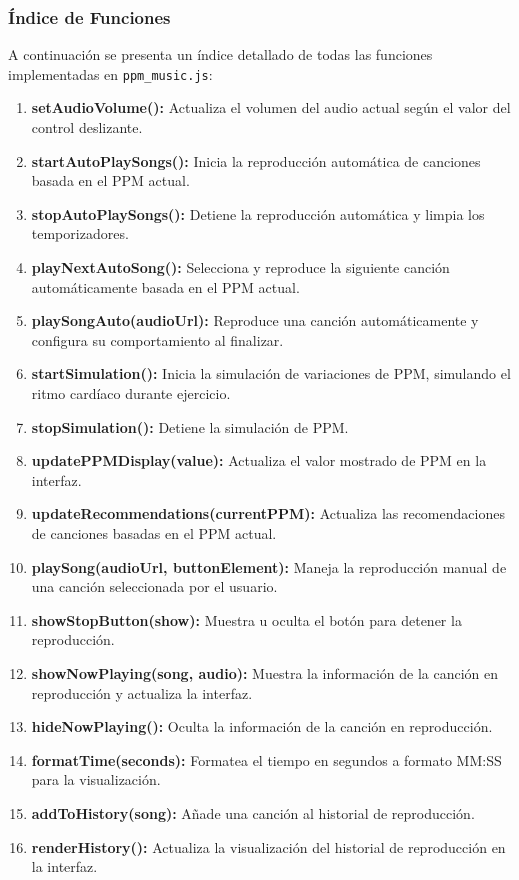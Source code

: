 \documentclass[a4paper,12pt]{article}
\begin{document}
\subsubsection{Índice de Funciones}
A continuación se presenta un índice detallado de todas las funciones implementadas en \texttt{ppm\_music.js}:

\begin{enumerate}
    \item \textbf{setAudioVolume():} Actualiza el volumen del audio actual según el valor del control deslizante.
    \item \textbf{startAutoPlaySongs():} Inicia la reproducción automática de canciones basada en el PPM actual.
    \item \textbf{stopAutoPlaySongs():} Detiene la reproducción automática y limpia los temporizadores.
    \item \textbf{playNextAutoSong():} Selecciona y reproduce la siguiente canción automáticamente basada en el PPM actual.
    \item \textbf{playSongAuto(audioUrl):} Reproduce una canción automáticamente y configura su comportamiento al finalizar.
    \item \textbf{startSimulation():} Inicia la simulación de variaciones de PPM, simulando el ritmo cardíaco durante ejercicio.
    \item \textbf{stopSimulation():} Detiene la simulación de PPM.
    \item \textbf{updatePPMDisplay(value):} Actualiza el valor mostrado de PPM en la interfaz.
    \item \textbf{updateRecommendations(currentPPM):} Actualiza las recomendaciones de canciones basadas en el PPM actual.
    \item \textbf{playSong(audioUrl, buttonElement):} Maneja la reproducción manual de una canción seleccionada por el usuario.
    \item \textbf{showStopButton(show):} Muestra u oculta el botón para detener la reproducción.
    \item \textbf{showNowPlaying(song, audio):} Muestra la información de la canción en reproducción y actualiza la interfaz.
    \item \textbf{hideNowPlaying():} Oculta la información de la canción en reproducción.
    \item \textbf{formatTime(seconds):} Formatea el tiempo en segundos a formato MM:SS para la visualización.
    \item \textbf{addToHistory(song):} Añade una canción al historial de reproducción.
    \item \textbf{renderHistory():} Actualiza la visualización del historial de reproducción en la interfaz.
\end{enumerate}
\end{document}
